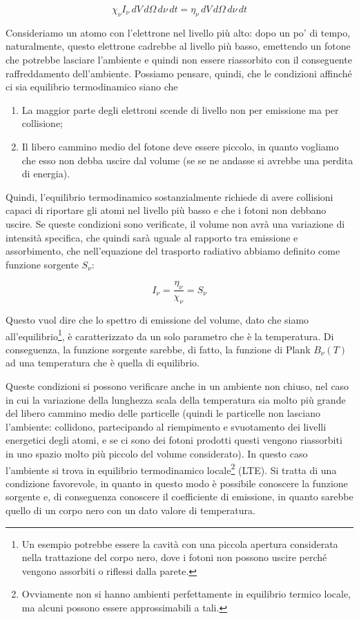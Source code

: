 $$\chi_\nu I_\nu \, dV \, d\Omega \, d\nu \, dt
=\eta_\nu \, dV \, d\Omega \, d\nu \, dt$$

Consideriamo un atomo con l'elettrone nel livello più alto: dopo un po' di tempo, naturalmente, questo elettrone cadrebbe al livello più basso, emettendo un fotone che potrebbe lasciare l'ambiente e quindi non essere riassorbito con il conseguente raffreddamento dell'ambiente. Possiamo pensare, quindi, che le condizioni affinché ci sia equilibrio termodinamico siano che

\begin{enumerate}
  \item La maggior parte degli elettroni scende di livello non per emissione ma per collisione;
  \item Il libero cammino medio del fotone deve essere piccolo, in quanto vogliamo che esso non debba uscire dal volume (se se ne andasse si avrebbe una perdita di energia).
\end{enumerate}

Quindi, l'equilibrio termodinamico sostanzialmente richiede di avere collisioni capaci di riportare gli atomi nel livello più basso e che i fotoni non debbano uscire. Se queste condizioni sono verificate, il volume non avrà una variazione di intensità specifica, che quindi sarà uguale al rapporto tra emissione e assorbimento, che nell'equazione del trasporto radiativo abbiamo definito come funzione sorgente $S_\nu$:

$$I_\nu=\frac{\eta_\nu}{\chi_\nu}=S_\nu$$

Questo vuol dire che lo spettro di emissione del volume, dato che siamo all'equilibrio\footnote{Un esempio potrebbe essere la cavità con una piccola apertura considerata nella trattazione del corpo nero, dove i fotoni non possono uscire perché vengono assorbiti o riflessi dalla parete.}, è caratterizzato da un solo parametro che è la temperatura. Di conseguenza, la funzione sorgente sarebbe, di fatto, la funzione di Plank $B_\nu (T)$ ad una temperatura che è quella di equilibrio.

Queste condizioni si possono verificare anche in un ambiente non chiuso, nel caso in cui la variazione della lunghezza scala della temperatura sia molto più grande del libero cammino medio delle particelle (quindi le particelle non lasciano l'ambiente: collidono, partecipando al riempimento e svuotamento dei livelli energetici degli atomi, e se ci sono dei fotoni prodotti questi vengono riassorbiti in uno spazio molto più piccolo del volume considerato). In questo caso l'ambiente si trova in equilibrio termodinamico locale\footnote{Ovviamente non si hanno ambienti perfettamente in equilibrio termico locale, ma alcuni possono essere approssimabili a tali.} (LTE). Si tratta di una condizione favorevole, in quanto in questo modo è possibile conoscere la funzione sorgente e, di conseguenza conoscere il coefficiente di emissione, in quanto sarebbe quello di un corpo nero con un dato valore di temperatura.


